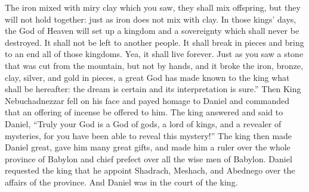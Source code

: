 \begin{enumerate}
     The iron mixed with miry clay which you saw, they shall mix offspring, but they will not hold together: just as iron does not mix with clay.%
     In those kings' days, the God of Heaven will set up a kingdom and a sovereignty which shall never be destroyed. It shall not be left to another people. It shall break in pieces and bring to an end all of those kingdoms. Yea, it shall live forever.%
     Just as you saw a stone that was cut from the mountain, but not by hands, and it broke the iron, bronze, clay, silver, and gold in pieces, a great God has made known to the king what shall be hereafter: the dream is certain and its interpretation is sure.''%
     Then King Nebuchadnezzar fell on his face and payed homage to Daniel and commanded that an offering of incense be offered to him.%
     The king answered and said to Daniel, ``Truly your God is a God of gods, a lord of kings, and a revealer of mysteries, for you have been able to reveal this mystery!''%
     The king then made Daniel great, gave him many great gifts, and made him a ruler over the whole province of Babylon and chief prefect over all the wise men of Babylon.%
     Daniel requested the king that he appoint Shadrach, Meshach, and Abednego over the affairs of the province. And Daniel was in the court of the king.%
\end{enumerate}
